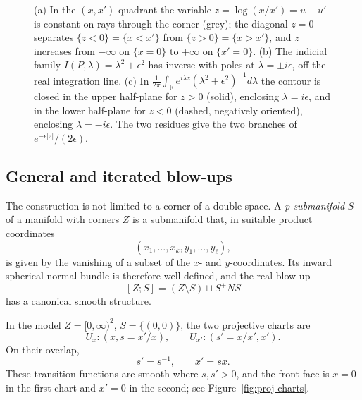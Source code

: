 \documentclass[12pt,oneside,reqno]{article}
\theoremstyle{plain}
\theoremstyle{definition}
\theoremstyle{remark}
\begin{document}
\begin{figure}[htbp]
\caption[Projective and Mellin pictures of the one-dimensional model]{
(a) In the \((x,x')\) quadrant the variable \(z=\log(x/x')=u-u'\) is
constant on rays through the corner (grey); the diagonal \(z=0\) separates
\(\{z<0\}=\{x<x'\}\) from \(\{z>0\}=\{x>x'\}\), and \(z\) increases from
\(-\infty\) on \(\{x=0\}\) to \(+\infty\) on \(\{x'=0\}\).  (b) The indicial
family \(I(P,\lambda)=\lambda^2+\epsilon^2\) has inverse with poles at
\(\lambda=\pm i\epsilon\), off the real integration line.  (c) In
\(\frac1{2\pi}\int_{\mathbb R}e^{i\lambda z}(\lambda^2+\epsilon^2)^{-1}d\lambda\) the
contour is closed in the upper half-plane for \(z>0\) (solid), enclosing
\(\lambda=i\epsilon\), and in the lower half-plane for \(z<0\) (dashed,
negatively oriented), enclosing \(\lambda=-i\epsilon\).  The two residues
give the two branches of \(e^{-\epsilon|z|}/(2\epsilon)\).}
\end{figure}

\subsection{General and iterated blow-ups}

The construction is not limited to a corner of a double space. A
\emph{p-submanifold} \(S\) of a manifold with corners \(Z\) is a
submanifold that, in suitable product coordinates
\[
 (x_1,\ldots,x_k,y_1,\ldots,y_\ell),
\]
is given by the vanishing of a subset of the \(x\)- and \(y\)-coordinates.
Its inward spherical normal bundle is therefore well defined, and the real
blow-up
\[
 [Z;S]=(Z\setminus S)\sqcup S^+NS
\]
has a canonical smooth structure.

In the model \(Z=[0,\infty)^2\), \(S=\{(0,0)\}\), the two projective charts
are
\[
 U_x:(x,s=x'/x),\qquad
 U_{x'}:(s'=x/x',x').
\]
On their overlap,
\[
 s'=s^{-1},\qquad x'=sx.
\]
These transition functions are smooth where \(s,s'>0\), and the front
face is \(x=0\) in the first chart and \(x'=0\) in the second; see
Figure~\ref{fig:proj-charts}.
\end{document}
